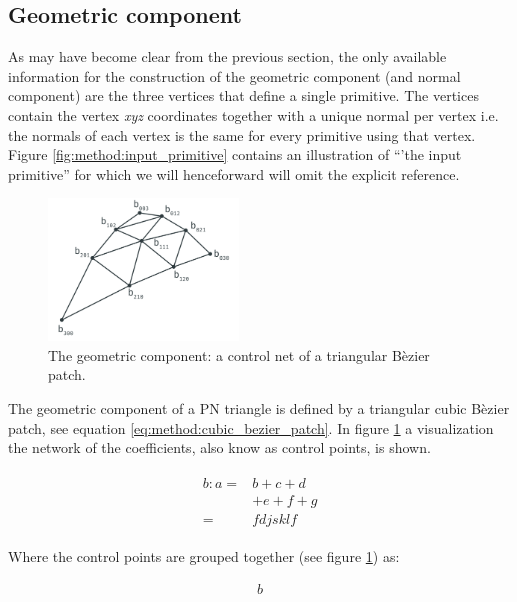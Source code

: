 
\subsection{Geometric component}
\label{ss:geometric_component}

As may have become clear from the previous section, the only available information for the construction of the geometric component (and normal component) are the three vertices that define a single primitive. The vertices contain the vertex \textit{xyz} coordinates together with a unique normal per vertex i.e. the normals of each vertex is the same for every primitive using that vertex. Figure \ref{fig:method:input_primitive} contains an illustration of ``'the input primitive'' for which we will henceforward will omit the explicit reference. 

\begin{figure}
	\centering
	\includegraphics[width=0.45\textwidth]{./content/img/method/geometry.png}
	\caption{The geometric component: a control net of a triangular B\`ezier patch.}
	\label{fig:method:control_net}
\end{figure}

The geometric component of a PN triangle is defined by a triangular cubic B\`ezier patch, see equation \ref{eq:method:cubic_bezier_patch}. In figure \ref{fig:method:control_net} a visualization the network of the coefficients, also know as control points, is shown.

\begin{align}\label{eq:method:cubic_bezier_patch}
\begin{split}
	b: 
    a ={}& b + c + d\\
         & + e + f + g\\
      ={}& fdjsklf
\end{split}
\end{align}

Where the control points are grouped together (see figure \ref{fig:method:control_net}) as:

\begin{align}\label{eq:method:control_coefficients}
	b	
\end{align}

